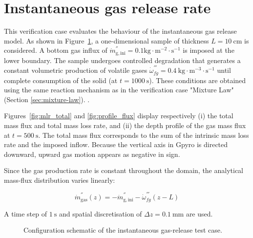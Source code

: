 \documentclass[12pt]{article}
\begin{document}
\fi


\section{Instantaneous gas release rate}

This verification case evaluates the behaviour of the instantaneous gas release model.  
As shown in Figure~\ref{fig:instant_config}, a one-dimensional sample of thickness \(L = 10\ \mathrm{cm}\) is considered.  
A bottom gas influx of $\dot{m}^{''}_{\mathrm{g,ini}}= 0.1 \mathrm{kg\cdot m^{-2}\cdot s^{-1}}$ is imposed at the lower boundary.  
The sample undergoes controlled degradation that generates a constant volumetric production of volatile gases  
\(\dot{\omega}_{fg}^{'''} = 0.4\ \mathrm{kg\cdot m^{-3}\cdot s^{-1}}\) until complete consumption of the solid (at \(t = 1000\ \mathrm{s}\)). These conditions are obtained using the same reaction mechanism as in the verification case "Mixture Law"
\ifdefined\Verification
(Section \ref{sec:mixture-law}).
\else
.
\fi

Figures~\ref{fig:mlr_total} and \ref{fig:profile_flux} display respectively (i) the total mass flux and total mass loss rate,  
and (ii) the depth profile of the gas mass flux at \(t = 500\ \mathrm{s}\). The total mass flux corresponds to the sum of the intrinsic mass loss rate and the imposed inflow.  
Because the vertical axis in Gpyro is directed downward, upward gas motion appears as negative in sign.  

Since the gas production rate is constant throughout the domain, the analytical mass-flux distribution varies linearly: 


\begin{equation}
	\dot{m}^{''}_{\mathrm{gas}}(z) = -\dot{m}^{''}_{\mathrm{g,ini}}- \dot{\omega}_{fg}^{'''}(z - L)
\end{equation} 


A time step of \(1\ \mathrm{s}\) and spatial discretisation of \(\Delta z = 0.1\ \mathrm{mm}\) are used.

\begin{figure}[H]
\centering
{}
\caption{Configuration schematic of the instantaneous gas-release test case.}
\label{fig:instant_config}
\end{figure}
\end{document}
